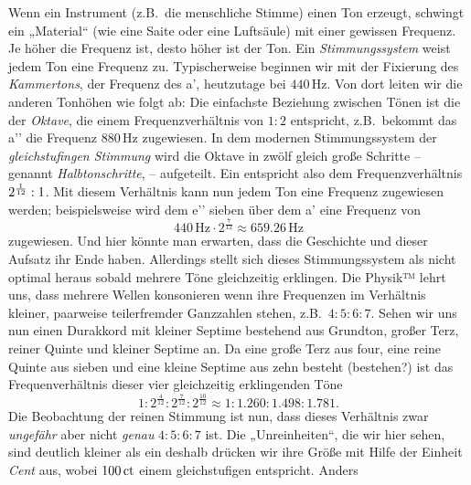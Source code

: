 \documentclass[ngerman,11pt]{scrartcl}
\begin{document}
Wenn ein Instrument (z.B.\ die menschliche Stimme) einen Ton erzeugt, schwingt
ein „Material“ (wie eine Saite oder eine Luftsäule) mit einer gewissen Frequenz.
Je höher die Frequenz ist, desto höher ist der Ton. Ein \emph{Stimmungssystem}
weist jedem Ton eine Frequenz zu. Typischerweise beginnen wir mit der Fixierung
des \emph{Kammertons}, der Frequenz des a’, heutzutage bei $440$\,Hz. Von dort
leiten wir die anderen Tonhöhen wie folgt ab: Die einfachste Beziehung zwischen
Tönen ist die der \emph{Oktave}, die einem Frequenzverhältnis von $1:2$
entspricht, z.B.\ bekommt das a’’ die Frequenz $880$\,Hz zugewiesen. In dem
modernen Stimmungssystem der \emph{gleichstufingen Stimmung} wird die Oktave in
zwölf gleich große Schritte – genannt \emph{Halbtonschritte},  – 
aufgeteilt. Ein  entspricht also dem Frequenzverhältnis
$2^{\smash{\frac1{12}}}:1$. Mit diesem Verhältnis kann nun jedem Ton eine
Frequenz zugewiesen werden; beispielsweise wird dem e’’ sieben 
über dem a’ eine Frequenz von 
\[440\,\text{Hz}\cdot 2^{\frac7{12}} \approx 659.26\,\text{Hz}\] zugewiesen. Und
hier könnte man erwarten, dass die Geschichte und dieser Aufsatz ihr Ende
haben. Allerdings stellt sich dieses Stimmungssystem als nicht optimal heraus
sobald mehrere Töne gleichzeitig erklingen. Die Physik™ lehrt uns, dass mehrere
Wellen konsonieren wenn ihre Frequenzen im Verhältnis kleiner, paarweise
teilerfremder Ganzzahlen stehen, z.B.\ $4:5:6:7$. Sehen wir uns nun einen
Durakkord mit kleiner Septime bestehend aus Grundton, großer Terz, reiner Quinte
und kleiner Septime an. Da eine große Terz aus four, eine reine Quinte aus
sieben und eine kleine Septime aus zehn  besteht (bestehen?)
ist das Frequenverhältnis dieser vier gleichzeitig erklingenden Töne
\[1:2^{\frac4{12}}:2^{\frac7{12}}:2^{\frac{10}{12}}\approx
1:1.260:1.498:1.781.\]%
Die Beobachtung der reinen Stimmung ist nun, dass dieses Verhältnis zwar
\emph{ungefähr} aber nicht \emph{genau} $4:5:6:7$ ist.
Die „Unreinheiten“, die wir hier sehen, sind deutlich kleiner als ein
 deshalb drücken wir ihre Größe mit Hilfe der Einheit \emph{Cent} aus,
wobei $100\,\mathrm{ct}$ einem gleichstufigen  entspricht. Anders
\end{document}
